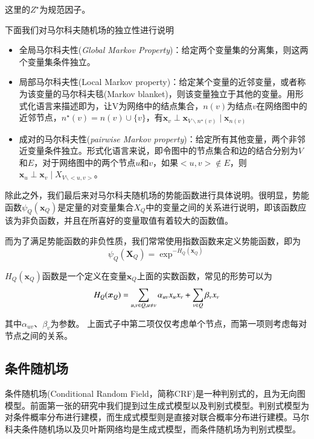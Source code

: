 这里的$Z^{\star}$为规范因子。


下面我们对马尔科夫随机场的独立性进行说明 \\
\begin{itemize}
\item 全局马尔科夫性(\textit{Global Markov Property})：给定两个变量集的分离集，则这两个变量集条件独立。 \\
\item 局部马尔科夫性(Local Markov property)：给定某个变量的近邻变量，或者称为该变量的马尔科夫毯(Markov blanket)，则该变量独立于其他的变量。用形式化语言来描述即为，让V为网络中的结点集合，$n(v)$为结点$v$在网络图中的近邻节点，$n^{\star}(v) = n(v)\cup \{v\}$，有$\bm{x}_v \perp \bm{x}_{V 	\backslash n^{\star}(v)} \mid \bm{x}_{n(v)} $ \\

\item 成对的马尔科夫性(\textit{pairwise Markov property})：给定所有其他变量，两个非邻近变量条件独立。形式化语言来说，即令图中的节点集合和边的结合分别为$V$和$E$，对于网络图中的两个节点$u$和$v$，如果$<u,v> \notin E$，则$\bm{x}_u \perp \bm{x}_v \mid X_{V \backslash <u, v>}$。\\


\end{itemize}



除此之外，我们最后来对马尔科夫随机场的势能函数进行具体说明。很明显，势能函数$\psi_Q(\bm{x}_Q)$是定量的对变量集合$X_Q$中的变量之间的关系进行说明，即该函数应该为非负函数，并且在所喜好的变量取值有着较大的函数值。

而为了满足势能函数的非负性质，我们常常使用指数函数来定义势能函数，即为
\begin{equation}
\psi_Q(\bm{X}_Q) = \exp^{-H_Q(\bm{x}_Q)}
\end{equation}

$H_Q(\bm{x}_Q)$函数是一个定义在变量$\bm{x}_Q$上面的实数函数，常见的形势可以为
\begin{equation}
H_Q(\bm{x}_Q) = \sum_{u,v \in Q, u \neq v} \alpha_{uv} x_u x_v + \sum_{v \in Q} \beta_v x_v \\
\end{equation}

其中$\alpha_{uv}$、$\beta_v$为参数。 上面式子中第二项仅仅考虑单个节点，而第一项则考虑每对节点之间的关系。



\subsection{条件随机场}
条件随机场(Conditional Random Field，简称CRF)是一种判别式的，且为无向图模型。前面第一张的研究中我们提到过生成式模型以及判别式模型。判别式模型为对条件概率分布进行建模，而生成式模型则是直接对联合概率分布进行建模。马尔科夫条件随机场以及贝叶斯网络均是生成式模型，而条件随机场为判别式模型。


